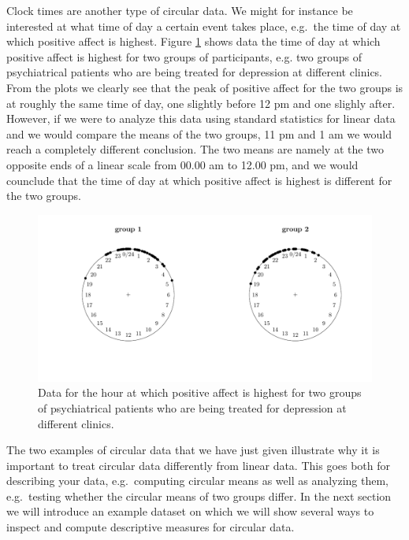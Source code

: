 \documentclass[11pt,]{article}
\begin{document}
Clock times are another type of circular data. We might for instance be
interested at what time of day a certain event takes place, e.g.~the
time of day at which positive affect is highest. Figure \ref{plothour}
shows data the time of day at which positive affect is highest for two
groups of participants, e.g. two groups of psychiatrical patients who
are being treated for depression at different clinics. From the plots we
clearly see that the peak of positive affect for the two groups is at
roughly the same time of day, one slightly before 12 pm and one slighly
after. However, if we were to analyze this data using standard
statistics for linear data and we would compare the means of the two
groups, 11 pm and 1 am we would reach a completely different conclusion.
The two means are namely at the two opposite ends of a linear scale from
00.00 am to 12.00 pm, and we would counclude that the time of day at
which positive affect is highest is different for the two groups.

\begin{figure}
        \centering

\includegraphics[width=\textwidth]{plothour.pdf}

         \caption{Data for the hour at which positive affect is highest for two groups of
psychiatrical patients who are being treated for depression at different
clinics.}
        \label{plothour}
\end{figure}

The two examples of circular data that we have just given illustrate why
it is important to treat circular data differently from linear data.
This goes both for describing your data, e.g.~computing circular means
as well as analyzing them, e.g.~testing whether the circular means of
two groups differ. In the next section we will introduce an example
dataset on which we will show several ways to inspect and compute
descriptive measures for circular data.
\end{document}
